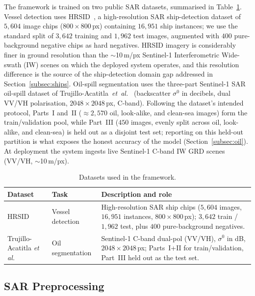 \documentclass[a4paper,11pt]{article}
\begin{document}
The framework is trained on two public SAR datasets, summarised in
Table~\ref{tab:datasets}. Vessel detection uses HRSID~\cite{wei2020}, a high-resolution
SAR ship-detection dataset of $5{,}604$ image chips ($800\times800$\,px) containing
$16{,}951$ ship instances; we use the standard split of $3{,}642$ training and $1{,}962$
test images, augmented with $400$ pure-background negative chips as hard negatives.
HRSID imagery is considerably finer in ground resolution than the $\sim$10\,m/px
Sentinel-1 Interferometric Wide-swath (IW) scenes on which the deployed system operates,
and this resolution difference is the source of the ship-detection domain gap addressed
in Section~\ref{subsec:ships}. Oil-spill segmentation uses the three-part Sentinel-1 SAR
oil-spill dataset of Trujillo-Acatitla~\textit{et~al.}~\cite{trujillo2024} (backscatter
$\sigma^0$ in decibels, dual VV/VH polarisation, $2048\times2048$\,px, C-band).
Following the dataset's intended protocol, Parts~I and~II ($\approx2{,}570$ oil,
look-alike, and clean-sea images) form the train/validation pool, while Part~III ($450$
images, evenly split across oil, look-alike, and clean-sea) is held out as a disjoint
test set; reporting on this held-out partition is what exposes the honest accuracy of
the model (Section~\ref{subsec:oil}). At deployment the system ingests live Sentinel-1
C-band IW GRD scenes (VV/VH, $\sim$10\,m/px).

\begin{table}[H]
\centering
\caption{Datasets used in the framework.}
\label{tab:datasets}
\begin{tabularx}{\textwidth}{@{}l l X@{}}
\toprule
\textbf{Dataset} & \textbf{Task} & \textbf{Description and role} \\
\midrule
HRSID~\cite{wei2020} & Vessel detection & High-resolution SAR ship chips ($5{,}604$ images, $16{,}951$ instances, $800\times800$\,px); $3{,}642$ train / $1{,}962$ test, plus $400$ pure-background negatives. \\
\addlinespace
Trujillo-Acatitla \textit{et al.}~\cite{trujillo2024} & Oil segmentation & Sentinel-1 C-band dual-pol (VV/VH), $\sigma^0$ in dB, $2048\times2048$\,px; Parts~I+II for train/validation, Part~III held out as the test set. \\
\bottomrule
\end{tabularx}
\end{table}

\subsection{SAR Preprocessing}
\label{subsec:prep}
\end{document}

